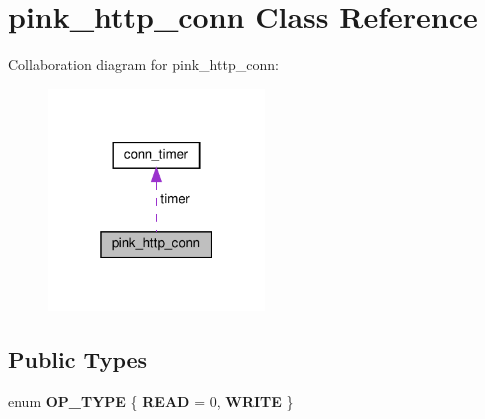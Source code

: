 \hypertarget{classpink__http__conn}{}\section{pink\+\_\+http\+\_\+conn Class Reference}
\label{classpink__http__conn}


Collaboration diagram for pink\+\_\+http\+\_\+conn\+:
\nopagebreak
\begin{figure}[H]
\begin{center}
\leavevmode
\includegraphics[width=163pt]{classpink__http__conn__coll__graph}
\end{center}
\end{figure}
\subsection*{Public Types}
\begin{DoxyCompactItemize}
\item 
\mbox{\label{classpink__http__conn_a7959fd18f89efd188dcbc662ff65ddcb}} 
enum {\bfseries O\+P\+\_\+\+T\+Y\+PE} \{ {\bfseries R\+E\+AD} = 0, 
{\bfseries W\+R\+I\+TE}
 \}
\end{DoxyCompactItemize}
